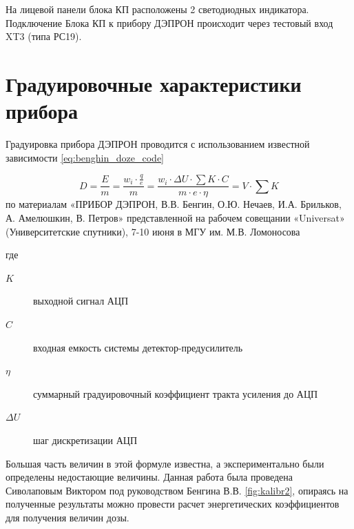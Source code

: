 На лицевой панели блока КП расположены 2 светодиодных индикатора. Подключение Блока КП к прибору ДЭПРОН происходит через тестовый вход XT3 (типа РС19).


\section{Градуировочные характеристики прибора}
Градуировка прибора ДЭПРОН проводится с использованием известной зависимости 
\ref{eq:benghin_doze_code}

\begin{equation}\label{eq:benghin_doze_code}
D = \frac{E}{m} = \dfrac{w_i \cdot\frac{q}{e}}{m} = \frac{w_i \cdot \Delta U \cdot\sum K \cdot C}{m \cdot e \cdot \eta}  = V \cdot \sum K
\end{equation}
по материалам  «ПРИБОР ДЭПРОН, В.В. Бенгин, О.Ю. Нечаев, И.А. Брильков, А. Амелюшкин, В. Петров»  представленной на рабочем совещании «Universat» (Университетские спутники), 7-10 июня в МГУ им. М.В. Ломоносова

где \begin{description}	
	\item[$ K $] выходной сигнал АЦП
	\item[$ C $] входная емкость системы детектор-предусилитель
	\item[$ \eta $] суммарный градуировочный коэффициент тракта усиления до АЦП
	\item[$ \Delta U $] шаг дискретизации АЦП
\end{description} 
Большая часть величин в этой формуле известна, а экспериментально были определены недостающие величины. Данная работа была проведена Сиволаповым Виктором под руководством Бенгина В.В. \ref{fig:kalibr2}, опираясь на полученные результаты можно провести расчет энергетических коэффициентов для получения величин дозы.

